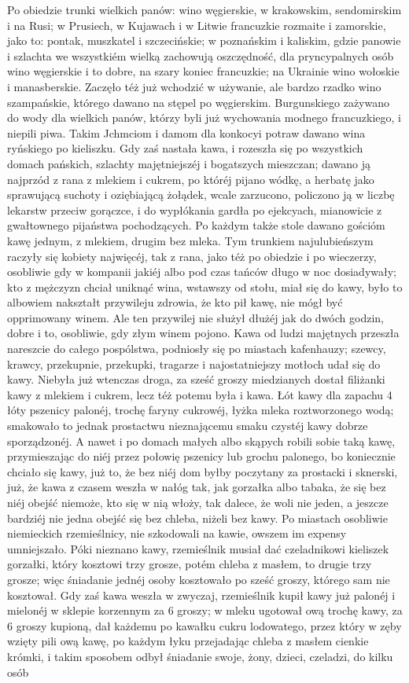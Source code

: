 \documentclass{book}
\begin{document}
Po obiedzie trunki wielkich panów: wino węgierskie, w krakowskim, sendomirskim i na Rusi; w Prusiech, w Kujawach i w Litwie francuzkie rozmaite i zamorskie, jako to: pontak, muszkatel i szczecińskie; w poznańskim i kaliskim, gdzie panowie i szlachta we wszystkiém wielką zachowują oszczędność, dla pryncypalnych osób wino węgierskie i to dobre, na szary koniec francuzkie; na Ukrainie wino wołoskie i manasberskie. Zaczęło téż już wchodzić w używanie, ale bardzo rzadko wino szampańskie, którego dawano na stępel po węgierskim. Burgunskiego zażywano do wody dla wielkich panów, którzy byli już wychowania modnego francuzkiego, i niepili piwa. Takim Jchmciom i damom dla konkocyi potraw dawano wina ryńskiego po kieliszku. Gdy zaś nastała kawa, i rozeszła się po wszystkich domach pańskich, szlachty majętniejszéj i bogatszych mieszczan; dawano ją najprzód z rana z mlekiem i cukrem, po któréj pijano wódkę, a herbatę jako sprawującą suchoty i oziębiającą żołądek, wcale zarzucono, policzono ją w liczbę lekarstw przeciw gorączce, i do wypłókania gardła po ejekcyach, mianowicie z gwałtownego pijaństwa pochodzących. Po każdym także stole dawano gościóm kawę jednym, z mlekiem, drugim bez mleka. Tym trunkiem najulubieńszym raczyły się kobiety najwięcéj, tak z rana, jako téż po obiedzie i po wieczerzy, osobliwie gdy w kompanii jakiéj albo pod czas tańców długo w noc dosiadywały; kto z mężczyzn chciał uniknąć wina, wstawszy od stołu, miał się do kawy, było to albowiem nakształt przywileju zdrowia, że kto pił kawę, nie mógł być opprimowany winem. Ale ten przywilej nie służył dłużéj jak do dwóch godzin, dobre i to, osobliwie, gdy złym winem pojono. Kawa od ludzi majętnych przeszła nareszcie do całego pospólstwa, podniosły się po miastach kafenhauzy; szewcy, krawcy, przekupnie, przekupki, tragarze i najostatniejszy motłoch udał się do kawy. Niebyła już wtenczas droga, za sześć groszy miedzianych dostał filiżanki kawy z mlekiem i cukrem, lecz téż potemu była i kawa. Łót kawy dla zapachu 4 łóty pszenicy palonéj, trochę faryny cukrowéj, łyżka mleka roztworzonego wodą; smakowało to jednak prostactwu nieznającemu smaku czystéj kawy dobrze sporządzonéj. A nawet i po domach małych albo skąpych robili sobie taką kawę, przymieszając do niéj przez połowię pszenicy lub grochu palonego, bo koniecznie chciało się kawy, już to, że bez niéj dom byłby poczytany za prostacki i sknerski, już, że kawa z czasem weszła w nałóg tak, jak gorzałka albo tabaka, że się bez niéj obejść niemoże, kto się w nią włoży, tak dalece, że woli nie jeden, a jeszcze bardziéj nie jedna obejść się bez chleba, niżeli bez kawy. Po miastach osobliwie niemieckich rzemieślnicy, nie szkodowali na kawie, owszem im expensy umniejszało. Póki nieznano kawy, rzemieślnik musiał dać czeladnikowi kieliszek gorzałki, który kosztowi trzy grosze, potém chleba z masłem, to drugie trzy grosze; więc śniadanie jednéj osoby kosztowało po sześć groszy, którego sam nie kosztował. Gdy zaś kawa weszła w zwyczaj, rzemieślnik kupił kawy już palonéj i mielonéj w sklepie korzennym za 6 groszy; w mleku ugotował ową trochę kawy, za 6 groszy kupioną, dał każdemu po kawałku cukru lodowatego, przez który w zęby wzięty pili ową kawę, po każdym łyku przejadając chleba z masłem cienkie krómki, i takim sposobem odbył śniadanie swoje, żony, dzieci, czeladzi, do kilku osób 
\end{document}
